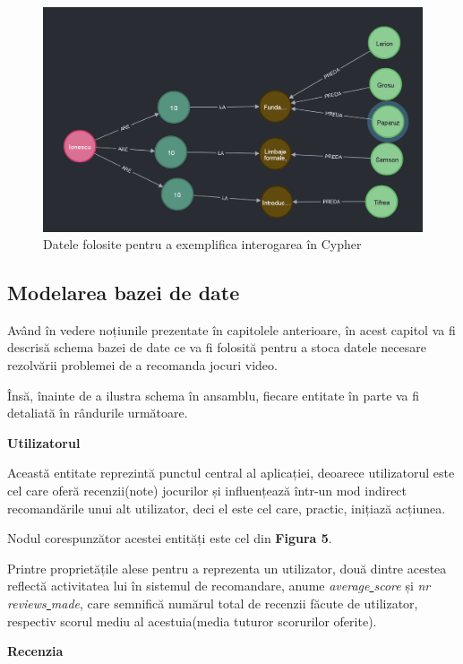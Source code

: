 \documentclass[12pt,a4paper]{report}
\begin{document}
\begin{figure}[h]
\centering
\caption{}
\includegraphics[scale=0.5]{exemplu_4_neo4j}
\caption*{Datele folosite pentru a exemplifica interogarea în Cypher}
\end{figure}

\subsection{Modelarea bazei de date}


Având în vedere noțiunile prezentate în capitolele anterioare, în acest capitol va fi descrisă schema bazei de date ce va fi folosită pentru a stoca datele necesare rezolvării problemei de a recomanda jocuri video.

Însă, înainte de a ilustra schema în ansamblu, fiecare entitate în parte va fi detaliată în rândurile următoare.

\bigskip
\textbf{Utilizatorul}
\bigskip

Această entitate reprezintă punctul central al aplicației, deoarece utilizatorul este cel care oferă recenzii(note) jocurilor și influențează într-un mod indirect recomandările unui alt utilizator, deci el este cel care, practic, inițiază acțiunea.

Nodul corespunzător acestei entități este cel din \textbf{Figura 5}.

Printre proprietățile alese pentru a reprezenta un utilizator, două dintre acestea reflectă activitatea lui în sistemul de recomandare, anume \emph{average\underline{ }score} și \emph{nr\underline{ }reviews\underline{ }made}, care semnifică numărul total de recenzii făcute de utilizator, respectiv scorul mediu al acestuia(media tuturor scorurilor oferite).

\bigskip
\textbf{Recenzia}
\bigskip
\end{document}

